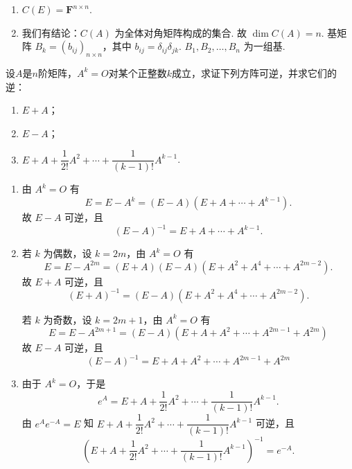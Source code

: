 \begin{exercise}
\begin{exgroup}
\begin{answer}
\begin{enumerate}
                \item $ C(E) = \mathbf{F}^{n \times n} $.

                \item 我们有结论：$ C(A) $ 为全体对角矩阵构成的集合. 故 $ \dim C(A) = n $. 基矩阵 $ B_k = (b_{ij})_{n \times n} $，其中 $ b_{ij} = \delta_{ij} \delta_{jk} $. $ B_1, B_2, \ldots, B_n $ 为一组基.
            \end{enumerate}
        \end{answer}

        \item 设$A$是$n$阶矩阵，$A^k=O$对某个正整数$k$成立，求证下列方阵可逆，并求它们的逆：
        \begin{enumerate}
            \item $E+A$；

            \item $E-A$；

            \item $E+A+\dfrac{1}{2!}A^2+\cdots+\dfrac{1}{(k-1)!}A^{k-1}$.
        \end{enumerate}
        \begin{answer}
            \begin{enumerate}
                \item 由 $ A^k = O $ 有
                      \[ E = E - A^k = (E - A)(E + A + \cdots + A^{k - 1}). \]
                      故 $ E - A $ 可逆，且
                      \[ (E - A)^{-1} = E + A + \cdots + A^{k - 1}. \]

                \item 若 $ k $ 为偶数，设 $ k = 2m $，由 $ A^k = O $ 有
                      \[ E = E - A^{2m} = (E + A)(E - A)(E + A^2 + A^4 + \cdots + A^{2m - 2}). \]
                      故 $ E + A $ 可逆，且
                      \[ (E + A)^{-1} = (E - A)(E + A^2 + A^4 + \cdots + A^{2m - 2}). \]

                      若 $ k $ 为奇数，设 $ k = 2m + 1 $，由 $ A^k = O $ 有
                      \[ E = E - A^{2m + 1} = (E - A)(E + A + A^2 + \cdots + A^{2m - 1} + A^{2m}) \]
                      故 $ E - A $ 可逆，且
                      \[ (E - A)^{-1} = E + A + A^2 + \cdots + A^{2m - 1} + A^{2m} \]

                \item 由于 $ A^k = O $，于是
                      \[ e^A = E + A + \frac{1}{2!} A^2 + \cdots + \frac{1}{(k - 1)!} A^{k - 1}. \]
                      由 $ e^A e^{-A} = E $ 知 $ E + A + \dfrac{1}{2!} A^2 + \cdots + \dfrac{1}{(k - 1)!} A^{k - 1} $ 可逆，且
                      \[ (E + A + \frac{1}{2!} A^2 + \cdots + \frac{1}{(k - 1)!} A^{k - 1})^{-1} = e^{-A}. \]
            \end{enumerate}
        \end{answer}


\end{exgroup}
\end{exercise}
